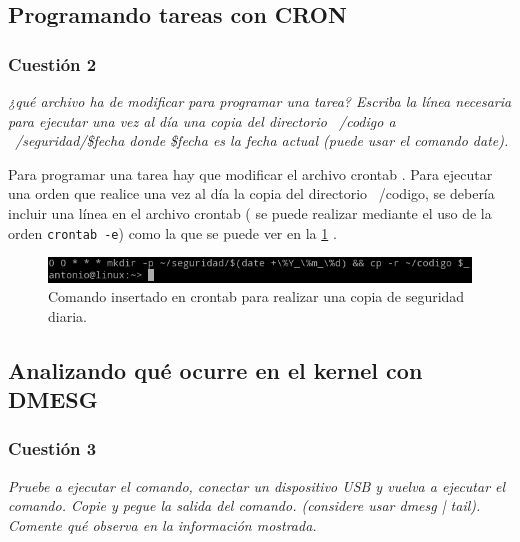 \subsection{Programando tareas con CRON}
\subsubsection{Cuestión 2}
\textit{¿qué archivo ha de modificar para programar una tarea? Escriba la línea necesaria para ejecutar una vez al día una copia del directorio ~/codigo a ~/seguridad/\$fecha donde \$fecha es la fecha actual (puede usar el comando date).}
\newline

Para programar una tarea hay que modificar el archivo crontab \cite{cron} \cite{cron2}. Para ejecutar una orden que realice una vez al día la copia del directorio ~/codigo, se debería incluir una línea en el archivo crontab ( se puede realizar mediante el uso de la orden \texttt{crontab -e}) como la que se puede ver en la  \cref{fig1} \cite{date}.

\begin{figure}[H]
  \begin{center}
    \includegraphics[width=1\textwidth]{imagenes/cron}
    \caption{Comando insertado en crontab para realizar una copia de seguridad diaria.}
    \label{fig1}
  \end{center}
\end{figure}

\subsection{Analizando qué ocurre en el kernel con DMESG}


\subsubsection{Cuestión 3}
\textit{Pruebe a ejecutar el comando, conectar un dispositivo USB y vuelva a ejecutar el comando. Copie y pegue la salida del comando. (considere usar dmesg | tail). Comente qué observa en la información mostrada.}
\newline

